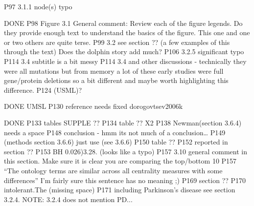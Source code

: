 P97 3.1.1 node(s) typo

DONE
P98 Figure 3.1 General comment: Review each of the figure legends. Do they provide enough text to understand the basics of the figure. This one and one or two others are quite terse.
P99 3.2 see section ??  (a few examples of this through the text)
Does the dolphin story add much?
P106 3.2.5 significant typo
P114 3.4 subtitle is a bit messy
P114 3.4 and other discussions - technically they were all mutations but from memory a lot of these early studies were full gene/protein deletions so a bit different and maybe worth highlighting this difference.
P124 (USML)?

DONE  UMSL
P130 reference needs fixed dorogovtsev2006k


DONE
P133 tables SUPPLE ??
P134 table ?? X2
P138 Newman(section 3.6.4) needs a space
P148 conclusion - hmm its not much of a conclusion…
P149 (methods section 3.6.6) just use (see 3.6.6)
P150 table ??
P152 reported in section ??
P153 BH 0.026)3.28. (looks like a typo)
P157 3.10 general comment in this section. Make sure it is clear you are comparing the top/bottom 10%
P157 “The ontology terms are similar across all centrality measures with some differences” I’m fairly sure this sentence has no meaning ;)
P169 section ??
P170 intolerant.The (missing space)
P171 including Parkinson’s disease see section 3.2.4. NOTE: 3.2.4 does not mention PD...

